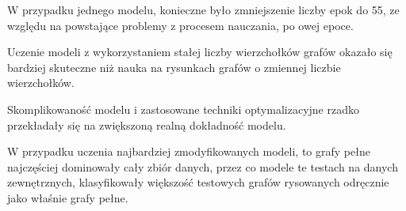 W przypadku jednego modelu, konieczne było zmniejszenie liczby epok do 55,
ze względu na powstające problemy z procesem nauczania, po owej epoce.

Uczenie modeli z wykorzystaniem stałej liczby wierzchołków grafów okazało się bardziej skuteczne
niż nauka na rysunkach grafów o zmiennej liczbie wierzchołków.

Skomplikowaność modelu i zastosowane techniki optymalizacyjne rzadko przekładały się na zwiększoną realną dokładność modelu.

W przypadku uczenia najbardziej zmodyfikowanych modeli, to grafy pełne najczęściej dominowały cały zbiór danych,
przez co modele te testach na danych zewnętrznych,
klasyfikowały większość testowych grafów rysowanych odręcznie jako właśnie grafy pełne.